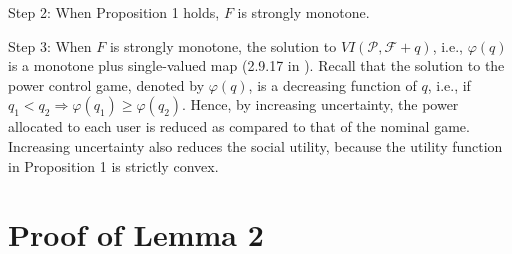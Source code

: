 \documentclass[peerreview,onecolumn,11pt,draftclsnofoot]{IEEEtran}\usepackage{amsmath}\usepackage{amsfonts}\usepackage{epsfig}\usepackage{amssymb}\usepackage{graphicx}\usepackage{amssymb,amsmath}\usepackage{cite}\usepackage{color,soul}\newcommand\T{\rule{0pt}{3.1ex}}
\begin{document}
Step 2:  When Proposition 1 holds, $F$ is strongly monotone.

Step 3: When $F$ is strongly monotone, the solution to $VI(\mathcal{P}, \mathcal{F}+q)$, i.e., $\varphi(q)$ is a monotone plus single-valued map (2.9.17 in \cite{PangVI}). Recall that the solution to the power control game, denoted by $\varphi(q)$, is a decreasing function of $q$, i.e., if $q_1 < q_2 \Longrightarrow \varphi(q_1) \geq \varphi(q_2)$.
Hence, by increasing uncertainty, the power allocated to each user is reduced as compared to that of the nominal game. Increasing uncertainty also reduces the social utility, because the utility function in Proposition 1 is strictly convex.

\section{Proof of Lemma 2}
\end{document}
